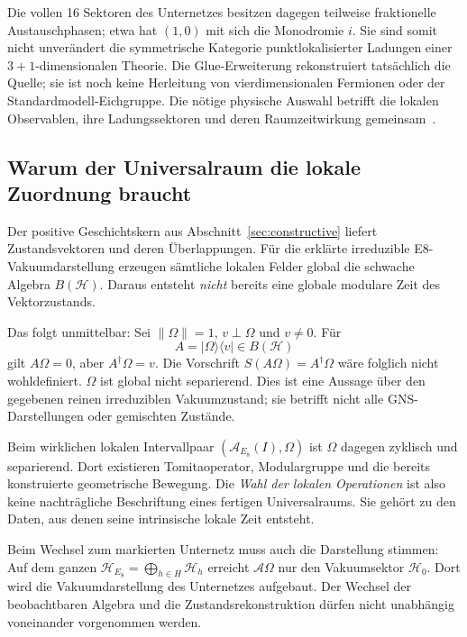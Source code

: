 Die vollen 16 Sektoren des Unternetzes besitzen dagegen teilweise fraktionelle Austauschphasen; etwa hat $(1,0)$ mit sich die Monodromie $i$. Sie sind somit nicht unverändert die symmetrische Kategorie punktlokalisierter Ladungen einer $3+1$-dimensionalen Theorie. Die Glue-Erweiterung rekonstruiert tatsächlich die Quelle; sie ist noch keine Herleitung von vierdimensionalen Fermionen oder der Standardmodell-Eichgruppe. Die nötige physische Auswahl betrifft die lokalen Observablen, ihre Ladungssektoren und deren Raumzeitwirkung gemeinsam~\cite{doplicherroberts}.

\subsection{Warum der Universalraum die lokale Zuordnung braucht}\label{sec:localmodular}
Der positive Geschichtskern aus Abschnitt~\ref{sec:constructive} liefert Zustandsvektoren und deren Überlappungen. Für die erklärte irreduzible E8-Vakuumdarstellung erzeugen sämtliche lokalen Felder global die schwache Algebra $B(\mathcal H)$. Daraus entsteht \emph{nicht} bereits eine globale modulare Zeit des Vektorzustands.

Das folgt unmittelbar: Sei $\|\Omega\|=1$, $v\perp\Omega$ und $v\ne0$. Für
\begin{equation}
A=|\Omega\rangle\langle v|\in B(\mathcal H)
\end{equation}
gilt $A\Omega=0$, aber $A^\dagger\Omega=v$. Die Vorschrift
$S(A\Omega)=A^\dagger\Omega$ wäre folglich nicht wohldefiniert. $\Omega$ ist global nicht separierend. Dies ist eine Aussage über den gegebenen reinen irreduziblen Vakuumzustand; sie betrifft nicht alle GNS-Darstellungen oder gemischten Zustände.

Beim wirklichen lokalen Intervallpaar $(\mathcal A_{E_8}(I),\Omega)$ ist $\Omega$ dagegen zyklisch und separierend. Dort existieren Tomitaoperator, Modulargruppe und die bereits konstruierte geometrische Bewegung. Die \emph{Wahl der lokalen Operationen} ist also keine nachträgliche Beschriftung eines fertigen Universalraums. Sie gehört zu den Daten, aus denen seine intrinsische lokale Zeit entsteht.

Beim Wechsel zum markierten Unternetz muss auch die Darstellung stimmen: Auf dem ganzen $\mathcal H_{E_8}=\bigoplus_{h\in H}\mathcal H_h$ erreicht $\mathcal A\Omega$ nur den Vakuumsektor $\mathcal H_0$. Dort wird die Vakuumdarstellung des Unternetzes aufgebaut. Der Wechsel der beobachtbaren Algebra und die Zustandsrekonstruktion dürfen nicht unabhängig voneinander vorgenommen werden.

